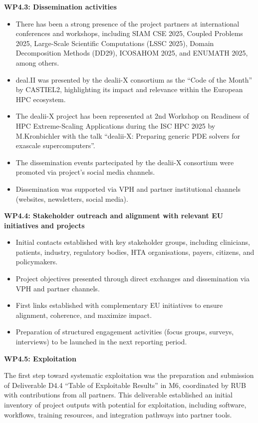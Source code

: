 \documentclass[a4paper,12pt, numbers]{article}
\begin{document}
\noindent\textbf{WP4.3: Dissemination activities}

\begin{itemize}[left=1em, itemsep=0pt, topsep=0pt]
\item There has been a strong presence of the project partners at international conferences and workshops, including SIAM CSE 2025, Coupled Problems 2025, Large-Scale Scientific Computations (LSSC 2025), Domain Decomposition Methods (DD29), ICOSAHOM 2025, and ENUMATH 2025, among others.
\item deal.II was presented by the dealii-X consortium as the “Code of the Month” by CASTIEL2, highlighting its impact and relevance within the European HPC ecosystem. 
\item The dealii-X project has been represented at 2nd Workshop on Readiness of HPC Extreme-Scaling Applications during the ISC HPC 2025 by M.Kronbichler with the talk ``dealii-X: Preparing generic PDE solvers for exascale supercomputers''.
\item The dissemination events partecipated by the dealii-X consortium were promoted via project's social media channels. 
\item Dissemination was supported via VPH and partner institutional channels (websites, newsletters, social media).
\end{itemize}

\noindent\textbf{WP4.4: Stakeholder outreach and alignment with relevant EU initiatives and projects} %


\begin{itemize}[left=1em, itemsep=0pt, topsep=0pt]
\item Initial contacts established with key stakeholder groups, including clinicians, patients, industry, regulatory bodies, HTA organisations, payers, citizens, and policymakers.
\item Project objectives presented through direct exchanges and dissemination via VPH and partner channels.
\item First links established with complementary EU initiatives to ensure alignment, coherence, and maximize impact.
\item Preparation of structured engagement activities (focus groups, surveys, interviews) to be launched in the next reporting period.
\end{itemize}



\noindent\textbf{WP4.5: Exploitation}

The first step toward systematic exploitation was the preparation and submission of Deliverable D4.4 ``Table of Exploitable Results'' in M6, coordinated by RUB with contributions from all partners. This deliverable established an initial inventory of project outputs with potential for exploitation, including software, workflows, training resources, and integration pathways into partner tools.  
\end{document}
